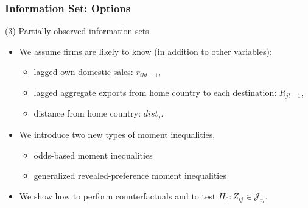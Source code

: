 \documentclass[10pt,letterpaper]{beamer}
\begin{document}
\begin{frame}[label=mom_ineq_slide]
\frametitle{Information Set: Options}

(3) Partially observed information sets
\begin{itemize}
	\item We assume firms are likely to know (in addition to other variables):
	\begin{itemize}
		\item lagged own domestic sales: $r_{iht-1}$,
		\item lagged aggregate exports from home country to each destination: $R_{jt-1}$,
		\item distance from home country: $dist_{j}$.
	\end{itemize}
	\item We introduce two new types of moment inequalities,
	\begin{itemize}
		\item odds-based moment inequalities
		\item generalized revealed-preference moment inequalities
	\end{itemize}
	\item We show how to perform counterfactuals and to test $H_{0}: Z_{ij}\in\mathcal{J}_{ij}$.
\end{itemize}
\end{frame}
\end{document}
